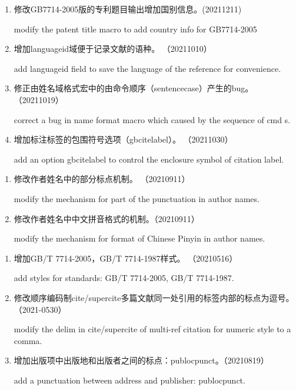 \label{up:20211211}

\begin{enumerate}

\item 修改GB7714-2005版的专利题目输出增加国别信息。(20211211)

modify the patent title macro to add country info for GB7714-2005

\item 增加languageid域便于记录文献的语种。 （20211010）

add languageid field to save the language of the reference for convenience.

\item 修正由姓名域格式宏中的由命令顺序（sentencecase）产生的bug。 （20211019）

correct a bug in name format macro which caused by the sequence of cmd
s.

\item 增加标注标签的包围符号选项（gbcitelabel）。 （20211030）

add an option gbcitelabel to control the enclosure symbol of citation label.

\end{enumerate}


\label{up:20210911}

\begin{enumerate}
\item 修改作者姓名中的部分标点机制。 （20210911）

modify the mechanism for part of the punctuation in author names.

\item 修改作者姓名中中文拼音格式的机制。（20210911）

modify the mechanism for format of Chinese Pinyin in author names.

\end{enumerate}



\label{up:20210819}

\begin{enumerate}
\item 增加GB/T 7714-2005，GB/T 7714-1987样式。 （20210516）

add styles for standards: GB/T 7714-2005, GB/T 7714-1987.

\item 修改顺序编码制cite/supercite多篇文献同一处引用的标签内部的标点为逗号。（2021-0530）

modify the delim in cite/supercite of multi-ref citation for numeric style to a comma.

\item 增加出版项中出版地和出版者之间的标点：publocpunct。（20210819）

add a punctuation between address and publisher: publocpunct.


\end{enumerate}


